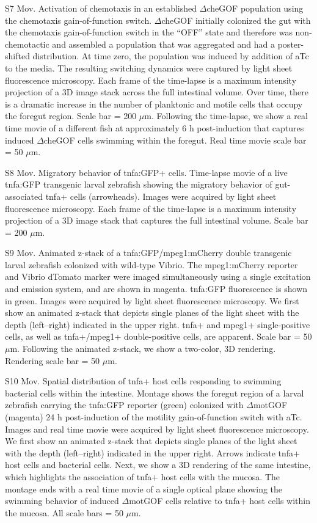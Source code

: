 S7 Mov. Activation of chemotaxis in an established $\Delta$cheGOF population using the chemotaxis gain-of-function switch. 
$\Delta$cheGOF initially colonized the gut with the chemotaxis gain-of-function switch in the ``OFF'' state and therefore was non-chemotactic and assembled a population that was aggregated and had a poster-shifted distribution. At time zero, the population was induced by addition of aTc to the media. The resulting switching dynamics were captured by light sheet fluorescence microscopy. Each frame of the time-lapse is a maximum intensity projection of a 3D image stack across the full intestinal volume. Over time, there is a dramatic increase in the number of planktonic and motile cells that occupy the foregut region. Scale bar = 200 $\mu$m. Following the time-lapse, we show a real time movie of a different fish at approximately 6 h post-induction that captures induced $\Delta$cheGOF cells swimming within the foregut. Real time movie scale bar = 50 $\mu$m.

S8 Mov. Migratory behavior of tnfa:GFP+ cells. 
Time-lapse movie of a live tnfa:GFP transgenic larval zebrafish showing the migratory behavior of gut-associated tnfa+ cells (arrowheads). Images were acquired by light sheet fluorescence microscopy. Each frame of the time-lapse is a maximum intensity projection of a 3D image stack that captures the full intestinal volume. Scale bar = 200 $\mu$m.

S9 Mov. Animated z-stack of a tnfa:GFP/mpeg1:mCherry double transgenic larval zebrafish colonized with wild-type Vibrio. 
The mpeg1:mCherry reporter and Vibrio dTomato marker were imaged simultaneously using a single excitation and emission system, and are shown in magenta. tnfa:GFP fluorescence is shown in green. Images were acquired by light sheet fluorescence microscopy. We first show an animated z-stack that depicts single planes of the light sheet with the depth (left–right) indicated in the upper right. tnfa+ and mpeg1+ single-positive cells, as well as tnfa+/mpeg1+ double-positive cells, are apparent. Scale bar = 50 $\mu$m. Following the animated z-stack, we show a two-color, 3D rendering. Rendering scale bar = 50 $\mu$m.

S10 Mov. Spatial distribution of tnfa+ host cells responding to swimming bacterial cells within the intestine. 
Montage shows the foregut region of a larval zebrafish carrying the tnfa:GFP reporter (green) colonized with $\Delta$motGOF (magenta) 24 h post-induction of the motility gain-of-function switch with aTc. Images and real time movie were acquired by light sheet fluorescence microscopy. We first show an animated z-stack that depicts single planes of the light sheet with the depth (left–right) indicated in the upper right. Arrows indicate tnfa+ host cells and bacterial cells. Next, we show a 3D rendering of the same intestine, which highlights the association of tnfa+ host cells with the mucosa. The montage ends with a real time movie of a single optical plane showing the swimming behavior of induced $\Delta$motGOF cells relative to tnfa+ host cells within the mucosa. All scale bars = 50 $\mu$m.

